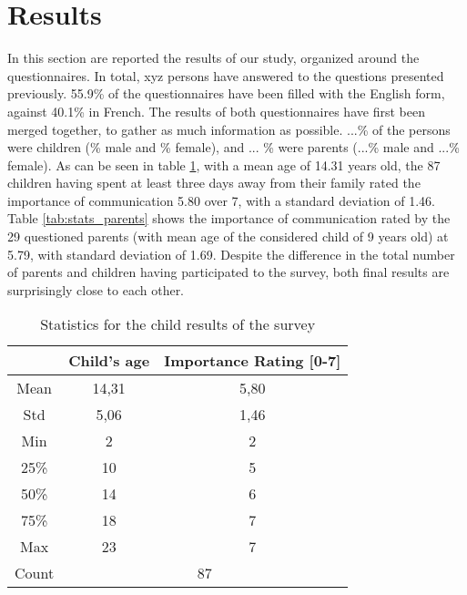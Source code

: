 \section{Results}
\label{results}

In this section are reported the results of our study, organized around the questionnaires. In total, xyz persons have answered to the questions presented previously. 55.9\% of the questionnaires have been filled with the English form, against 40.1\% in French. The results of both questionnaires have first been merged together, to gather as much information as possible. ...\% of the persons were children (\% male and \% female), and ... \% were parents (...\% male and ...\% female). As can be seen in table \ref{tab:stats_children}, with a mean age of 14.31 years old, the 87 children having spent at least three days away from their family rated the importance of communication 5.80 over 7, with a standard deviation of 1.46. Table \ref{tab:stats_parents} shows the importance of communication rated by the 29 questioned parents (with mean age of the considered child of 9 years old) at 5.79, with standard deviation of 1.69. Despite the difference in the total number of parents and children having participated to the survey, both final results are surprisingly close to each other.




\begin{table}[ht]
\centering
\caption{Statistics for the child results of the survey}
\label{tab:stats_children}
\begin{tabular}{c|c|c|}
\cline{2-3}
                            & \textbf{Child's age} & \textbf{Importance Rating {[}0-7{]}} \\ \hline
\multicolumn{1}{|c|}{Mean}  & 14,31                & 5,80                                 \\ 
\multicolumn{1}{|c|}{Std}   & 5,06                 & 1,46                                 \\ 
\multicolumn{1}{|c|}{Min}   & 2                    & 2                                    \\ 
\multicolumn{1}{|c|}{25\%}  & 10                   & 5                                    \\ 
\multicolumn{1}{|c|}{50\%}  & 14                   & 6                                    \\ 
\multicolumn{1}{|c|}{75\%}  & 18                   & 7                                    \\ 
\multicolumn{1}{|c|}{Max}   & 23                   & 7                                    \\ \hline
\multicolumn{1}{|c|}{Count} & \multicolumn{2}{c|}{87}                                     \\ \hline
\end{tabular}
\end{table}

